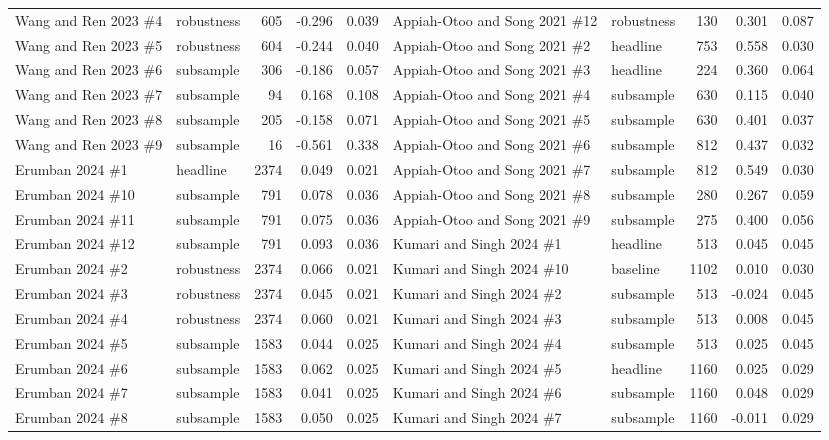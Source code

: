 {\begin{longtable}{@{}p{3.0cm} l r r r@{\hspace{0.8em}}p{3.0cm} l r r r@{}}
Wang and Ren 2023 \#4 & robustness & 605 & -0.296 & 0.039 & Appiah-Otoo and Song 2021 \#12 & robustness & 130 & 0.301 & 0.087 \\
Wang and Ren 2023 \#5 & robustness & 604 & -0.244 & 0.040 & Appiah-Otoo and Song 2021 \#2 & headline & 753 & 0.558 & 0.030 \\
Wang and Ren 2023 \#6 & subsample & 306 & -0.186 & 0.057 & Appiah-Otoo and Song 2021 \#3 & headline & 224 & 0.360 & 0.064 \\
Wang and Ren 2023 \#7 & subsample & 94 & 0.168 & 0.108 & Appiah-Otoo and Song 2021 \#4 & subsample & 630 & 0.115 & 0.040 \\
Wang and Ren 2023 \#8 & subsample & 205 & -0.158 & 0.071 & Appiah-Otoo and Song 2021 \#5 & subsample & 630 & 0.401 & 0.037 \\
Wang and Ren 2023 \#9 & subsample & 16 & -0.561 & 0.338 & Appiah-Otoo and Song 2021 \#6 & subsample & 812 & 0.437 & 0.032 \\
Erumban 2024 \#1 & headline & 2374 & 0.049 & 0.021 & Appiah-Otoo and Song 2021 \#7 & subsample & 812 & 0.549 & 0.030 \\
Erumban 2024 \#10 & subsample & 791 & 0.078 & 0.036 & Appiah-Otoo and Song 2021 \#8 & subsample & 280 & 0.267 & 0.059 \\
Erumban 2024 \#11 & subsample & 791 & 0.075 & 0.036 & Appiah-Otoo and Song 2021 \#9 & subsample & 275 & 0.400 & 0.056 \\
Erumban 2024 \#12 & subsample & 791 & 0.093 & 0.036 & Kumari and Singh 2024 \#1 & headline & 513 & 0.045 & 0.045 \\
Erumban 2024 \#2 & robustness & 2374 & 0.066 & 0.021 & Kumari and Singh 2024 \#10 & baseline & 1102 & 0.010 & 0.030 \\
Erumban 2024 \#3 & robustness & 2374 & 0.045 & 0.021 & Kumari and Singh 2024 \#2 & subsample & 513 & -0.024 & 0.045 \\
Erumban 2024 \#4 & robustness & 2374 & 0.060 & 0.021 & Kumari and Singh 2024 \#3 & subsample & 513 & 0.008 & 0.045 \\
Erumban 2024 \#5 & subsample & 1583 & 0.044 & 0.025 & Kumari and Singh 2024 \#4 & subsample & 513 & 0.025 & 0.045 \\
Erumban 2024 \#6 & subsample & 1583 & 0.062 & 0.025 & Kumari and Singh 2024 \#5 & headline & 1160 & 0.025 & 0.029 \\
Erumban 2024 \#7 & subsample & 1583 & 0.041 & 0.025 & Kumari and Singh 2024 \#6 & subsample & 1160 & 0.048 & 0.029 \\
Erumban 2024 \#8 & subsample & 1583 & 0.050 & 0.025 & Kumari and Singh 2024 \#7 & subsample & 1160 & -0.011 & 0.029 \\

\end{longtable}}
